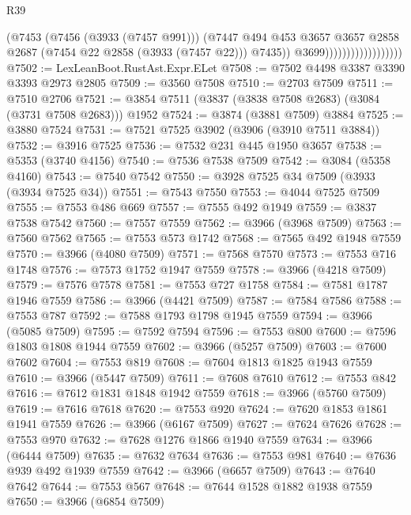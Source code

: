\begin{lexlean}{R39}
\begin{coremodule}
                                        (@7453
                                          (@7456 (@3933 (@7457 @991)))
                                          (@7447
                                            @494
                                            @453
                                            @3657
                                            @3657
                                            @2858
                                            @2687
                                            (@7454 @22 @2858 (@3933 (@7457 @22)))
                                            @7435))
                                        @3699))))))))))))))))))
@7502 := LexLeanBoot.RustAst.Expr.ELet
@7508 := @7502 @4498 @3387 @3390 @3393 @2973 @2805
@7509 := @3560 @7508
@7510 := @2703 @7509
@7511 := @7510 @2706
@7521 := @3854 @7511 (@3837 (@3838 @7508 @2683) (@3084 (@3731 @7508 @2683))) @1952
@7524 := @3874 (@3881 @7509) @3884
@7525 := @3880 @7524
@7531 := @7521 @7525 @3902 (@3906 (@3910 @7511 @3884))
@7532 := @3916 @7525
@7536 := @7532 @231 @445 @1950 @3657
@7538 := @5353 (@3740 @4156)
@7540 := @7536 @7538 @7509
@7542 := @3084 (@5358 @4160)
@7543 := @7540 @7542
@7550 := @3928 @7525 @34 @7509 (@3933 (@3934 @7525 @34))
@7551 := @7543 @7550
@7553 := @4044 @7525 @7509
@7555 := @7553 @486 @669
@7557 := @7555 @492 @1949
@7559 := @3837 @7538 @7542
@7560 := @7557 @7559
@7562 := @3966 (@3968 @7509)
@7563 := @7560 @7562
@7565 := @7553 @573 @1742
@7568 := @7565 @492 @1948 @7559
@7570 := @3966 (@4080 @7509)
@7571 := @7568 @7570
@7573 := @7553 @716 @1748
@7576 := @7573 @1752 @1947 @7559
@7578 := @3966 (@4218 @7509)
@7579 := @7576 @7578
@7581 := @7553 @727 @1758
@7584 := @7581 @1787 @1946 @7559
@7586 := @3966 (@4421 @7509)
@7587 := @7584 @7586
@7588 := @7553 @787
@7592 := @7588 @1793 @1798 @1945 @7559
@7594 := @3966 (@5085 @7509)
@7595 := @7592 @7594
@7596 := @7553 @800
@7600 := @7596 @1803 @1808 @1944 @7559
@7602 := @3966 (@5257 @7509)
@7603 := @7600 @7602
@7604 := @7553 @819
@7608 := @7604 @1813 @1825 @1943 @7559
@7610 := @3966 (@5447 @7509)
@7611 := @7608 @7610
@7612 := @7553 @842
@7616 := @7612 @1831 @1848 @1942 @7559
@7618 := @3966 (@5760 @7509)
@7619 := @7616 @7618
@7620 := @7553 @920
@7624 := @7620 @1853 @1861 @1941 @7559
@7626 := @3966 (@6167 @7509)
@7627 := @7624 @7626
@7628 := @7553 @970
@7632 := @7628 @1276 @1866 @1940 @7559
@7634 := @3966 (@6444 @7509)
@7635 := @7632 @7634
@7636 := @7553 @981
@7640 := @7636 @939 @492 @1939 @7559
@7642 := @3966 (@6657 @7509)
@7643 := @7640 @7642
@7644 := @7553 @567
@7648 := @7644 @1528 @1882 @1938 @7559
@7650 := @3966 (@6854 @7509)

\end{coremodule}
\end{lexlean}
